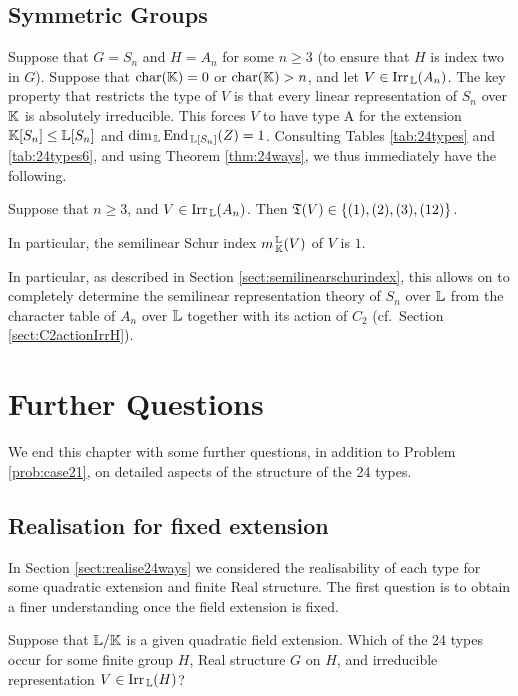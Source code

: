 \subsection{Symmetric Groups}

Suppose that $G = S_n$ and $H = A_n$ for some $n \geq 3$ (to ensure that $H$ is index two in $G$). Suppose that $\operatorname{char}({\mathbb K}) = 0$ or $\operatorname{char}({\mathbb K}) > n$, and let $V \in \operatorname{Irr}_{\, {\mathbb L}}(A_n)$. The key property that restricts the type of $V$ is that every linear representation of $S_n$ over ${\mathbb K}$ is absolutely irreducible. This forces $V$ to have type A for the extension ${\mathbb K}[S_n] \leq {\mathbb L}[S_n]$ and $\dim_{\, {\mathbb L}} \operatorname{End}_{\, {\mathbb L}[S_n]}(Z) = 1$. Consulting Tables \ref{tab:24types} and \ref{tab:24types6}, and using Theorem \ref{thm:24ways}, we thus immediately have the following.

\begin{cor}\label{cor:symgroups}
Suppose that $n \geq 3$, and $V \in \operatorname{Irr}_{\, {\mathbb L}}(A_n)$. Then ${\mathfrak T}(V) \in \{(1), (2), (3), (12)\}$.

In particular, the semilinear Schur index $m_{\, {\mathbb K}}^{\, {\mathbb L}}(V)$ of $V$ is $1$.
\end{cor}

In particular, as described in Section \ref{sect:semilinearschurindex}, this allows on to completely determine the semilinear representation theory of $S_n$ over ${\mathbb L}$ from the character table of $A_n$ over ${\mathbb L}$ together with its action of $C_2$ (cf.\ Section \ref{sect:C2actionIrrH}).

\section{Further Questions}\label{sect:24typesfurtherquestions}

We end this chapter with some further questions, in addition to Problem \ref{prob:case21}, on detailed aspects of the structure of the 24 types.

\subsection{Realisation for fixed extension}

In Section \ref{sect:realise24ways} we considered the realisability of each type for some quadratic extension and finite Real structure. The first question is to obtain a finer understanding once the field extension is fixed.

\begin{prob}
Suppose that ${\mathbb L} / {\mathbb K}$ is a given quadratic field extension. Which of the 24 types occur for some finite group $H$, Real structure $G$ on $H$, and irreducible representation $V \in \operatorname{Irr}_{\, {\mathbb L}}(H)$?
\end{prob}

